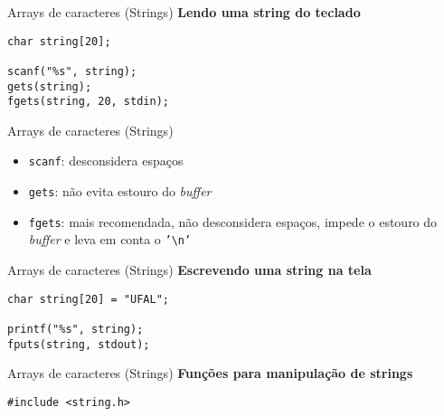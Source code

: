 \documentclass[10pt]{beamer}
\begin{document}
\begin{frame}[fragile]{Arrays de caracteres (Strings)}
    \huge \textbf{Lendo uma string do teclado}
    
    \bigskip
    
    \Large
    \begin{verbatim}
char string[20];
    
scanf("%s", string);
gets(string);
fgets(string, 20, stdin);
    \end{verbatim}
\end{frame}

\begin{frame}{Arrays de caracteres (Strings)}
    \Large
    \begin{itemize}
        \item [\faThumbsODown] \texttt{scanf}: desconsidera espaços 
        \item [\faThumbsODown] \texttt{gets}: não evita estouro do \textit{buffer}
        \item [\faThumbsOUp] \texttt{fgets}: mais recomendada, não desconsidera espaços, impede o estouro do \textit{buffer} e leva em conta o \texttt{'\textbackslash n'}
    \end{itemize}
\end{frame}

\begin{frame}[fragile]{Arrays de caracteres (Strings)}
    \huge \textbf{Escrevendo uma string na tela}
    
    \bigskip
    
    \Large
    \begin{verbatim}
char string[20] = "UFAL";
    
printf("%s", string);
fputs(string, stdout);
    \end{verbatim}
\end{frame}

\begin{frame}[fragile]{Arrays de caracteres (Strings)}
    \huge \textbf{Funções para manipulação de strings}
    
    \bigskip

    \begin{verbatim}
#include <string.h>
    \end{verbatim}
\end{frame}
\end{document}
